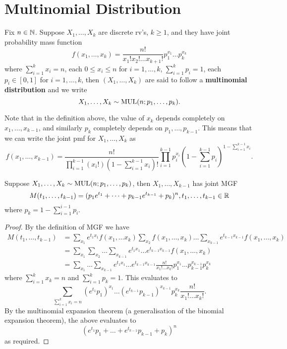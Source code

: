 \documentclass[11pt,fleqn]{book} %
\begin{document}

\section{Multinomial Distribution}

\begin{definition} 
Fix \(n \in \mathbb{N}\). Suppose \(X_1, \ldots, X_k\) are discrete rv's, \(k \geq 1\), and they have joint probability mass function
\[
f(x_1, \ldots, x_k) = \frac{n!}{x_1!x_2!\ldots x_{k+1}!}p_1^{x_1}\ldots p_{k}^{x_{k}}
\]
where \(\sum_{i=1}^{k}x_i = n\), each \(0 \leq x_i \leq n\) for \(i = 1, \ldots, k\), \(\sum_{i=1}^{k}p_i = 1\), each \(p_i \in [0, 1]\) for \(i = 1, \ldots, k\), then \((X_1, \ldots, X_{k})\) are said to follow a \textbf{multinomial distribution} and we write
\[
X_1, \ldots, X_{k} \sim \operatorname{MUL}(n; p_1, \ldots, p_k).
\]
\end{definition}

\begin{remark} Note that in the definition above, the value of \(x_{k}\) depends completely on \(x_1, \ldots, x_{k-1}\), and similarly \(p_{k}\) completely depends on \(p_1, \ldots, p_{k-1}\). This means that we can write the joint pmf for \(X_1, \ldots, X_k\) as
\[
f(x_1, \ldots, x_{k-1}) = \frac{n!}{\prod_{i=1}^{k-1} (x_i!) \left(1 - \sum_{i=1}^{k-1} x_i\right)!} \prod_{i=1}^{k-1} p_i^{x_i} \left(1 - \sum_{i=1}^{k-1} p_i\right)^{1 - \sum_{i=1}^{k-1} x_i}.
\]
\end{remark}

\begin{theorem} \label{thm:293}
Suppose \(X_1, \ldots, X_k \sim \operatorname{MUL}(n; p_1, \ldots, p_k)\), then \(X_1, \ldots, X_{k-1}\) has joint MGF
\[
M(t_1, \ldots, t_{k-1}) = (p_1e^{t_1} + \dots + p_{k-1}e^{t_{k-1}} + p_k)^n, t_1, \ldots, t_{k-1} \in \mathbb{R}
\]
where \(p_k = 1 - \sum_{i=1}^{i-1}p_i\).
\end{theorem}
\begin{proof} By the definition of MGF we have
\[
\begin{aligned}
M(t_1, \ldots, t_{k-1}) &= \sum_{x_1}e^{t_1x_1}f(x_1, \ldots x_k)\sum_{x_2}f(x_1, \ldots, x_k) \ldots \sum_{x_{k-1}} e^{t_{k-1}x_{k-1}}f(x_1, \ldots, x_k) \\
&= \sum_{x_1}\sum_{x_2}\ldots\sum_{x_{k-1}} e^{t_1x_1}\ldots e^{t_{k-1}x_{k-1}} f(x_1, \ldots, x_k) \\
&= \sum_{x_1}\ldots\sum_{x_{k-1}} e^{t_1x_1}\ldots e^{t_{k-1}x_{k-1}} \frac{n!}{x_1!\ldots x_k!}p_1^{x_1}\ldots p_{k-1}^{x_{k-1}}p_k^{x_k}
\end{aligned}
\]
where \(\sum_{i=1}^k x_k = n\) and \(\sum_{i=1}^k p_k = 1\). This evaluates to
\[
\sum_{\sum_{i=1}^k x_i = n}(e^{t_1}p_1)^{x_1}\ldots (e^{t_{k-1}}p_{k-1})^{x_{k-1}}p_k^{x_k}\frac{n!}{x_1!\ldots x_k!}.
\]
\indent By the multinomial expansion theorem (a generalisation of the binomial expansion theorem), the above evaluates to
\[
(e^{t_1}p_1 + \dots + e^{t_{k-1}}p_{k-1} + p_k)^n
\]
as required.
\end{proof}
\end{document}
